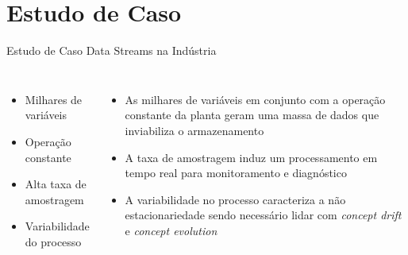 \section{Estudo de Caso}
\begin{frame}{Estudo de Caso}
	Data Streams na Indústria
	\begin{columns}
	    
        	\begin{itemize}
        	    \item Milhares de variáveis
                \item Operação constante        	    
        	    \item Alta taxa de amostragem
        	    \item Variabilidade do processo
        	\end{itemize}
    	
    	    \begin{itemize}
        	    \item As milhares de variáveis em conjunto com a operação constante da planta geram uma massa de dados que inviabiliza o armazenamento
        	    \item A taxa de amostragem induz um processamento em tempo real para monitoramento e diagnóstico
        	    \item A variabilidade no processo caracteriza a não estacionariedade sendo necessário lidar com \textit{concept drift} e \textit{concept evolution}
        	\end{itemize}
    \end{columns}
\end{frame}
